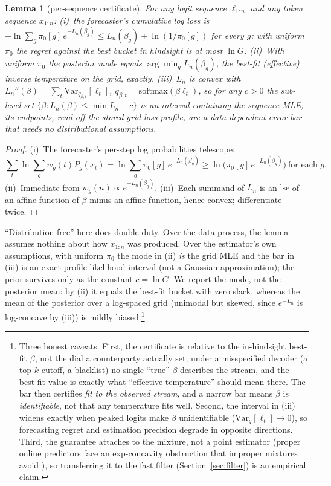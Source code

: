 \documentclass[11pt]{article}
\newtheorem{lemma}{Lemma}
\begin{document}
\begin{lemma}[per-sequence certificate]\label{lem:certificate}
For any logit sequence $\ell_{1:n}$ and any token sequence $x_{1:n}$:
(i)~the forecaster's cumulative log loss is
$-\ln \sum_g \pi_0[g]\, e^{-L_n(\beta_g)} \le L_n(\beta_g) + \ln(1/\pi_0[g])$
for every $g$; with uniform $\pi_0$ the regret against the best bucket in
hindsight is at most $\ln G$.
(ii)~With uniform $\pi_0$ the posterior mode equals $\arg\min_g L_n(\beta_g)$,
the best-fit (\emph{effective}) inverse temperature on the grid, exactly.
(iii)~$L_n$ is convex with $L_n''(\beta) = \sum_t \mathrm{Var}_{q_{\beta,t}}[\ell_t]$,
$q_{\beta,t} = \mathrm{softmax}(\beta\ell_t)$, so for any $c>0$ the sub-level set
$\{\beta : L_n(\beta) \le \min L_n + c\}$ is an interval containing the sequence
MLE; its endpoints, read off the stored grid loss profile, are a data-dependent
error bar that needs no distributional assumptions.
\end{lemma}

\begin{proof}
(i)~The forecaster's per-step log probabilities telescope:
\[
  \textstyle\sum_t \ln \sum_g w_g(t) P_g(x_t)
  = \ln \sum_g \pi_0[g]\, e^{-L_n(\beta_g)}
  \ge \ln\big(\pi_0[g]\, e^{-L_n(\beta_g)}\big)\ \text{for each } g.
\]
(ii)~Immediate from $w_g(n) \propto e^{-L_n(\beta_g)}$.
(iii)~Each summand of $L_n$ is an $\mathrm{lse}$ of an affine function of $\beta$
minus an affine function, hence convex; differentiate twice.
\end{proof}

``Distribution-free'' here does double duty. Over the data process, the lemma
assumes nothing about how $x_{1:n}$ was produced. Over the estimator's own
assumptions, with uniform $\pi_0$ the mode in (ii) \emph{is} the grid MLE and the
bar in (iii) is an exact profile-likelihood interval (not a Gaussian
approximation); the prior survives only as the constant $c=\ln G$. We report the
mode, not the posterior mean: by (ii) it equals the best-fit bucket with zero
slack, whereas the mean of the posterior over a log-spaced grid (unimodal but
skewed, since $e^{-L_n}$ is log-concave by (iii)) is mildly biased.\footnote{Three honest caveats.
First, the certificate is relative to the in-hindsight best-fit $\beta$, not the
dial a counterparty actually set; under a misspecified decoder (a top-$k$ cutoff,
a blacklist) no single ``true'' $\beta$ describes the stream, and the best-fit
value is exactly what ``effective temperature'' should mean there. The bar then
certifies \emph{fit to the observed stream}, and a narrow bar means $\beta$ is
\emph{identifiable}, not that any temperature fits well. Second, the interval in
(iii) widens exactly when peaked logits make $\beta$ unidentifiable
($\mathrm{Var}_{q}[\ell_t]\to 0$), so forecasting regret and estimation precision
degrade in opposite directions. Third, the guarantee attaches to the mixture, not
a point estimator (proper online predictors face an exp-concavity obstruction
that improper mixtures avoid \citep{foster2018logistic}), so transferring it to
the fast filter (Section~\ref{sec:filter}) is an empirical claim.}
\end{document}

